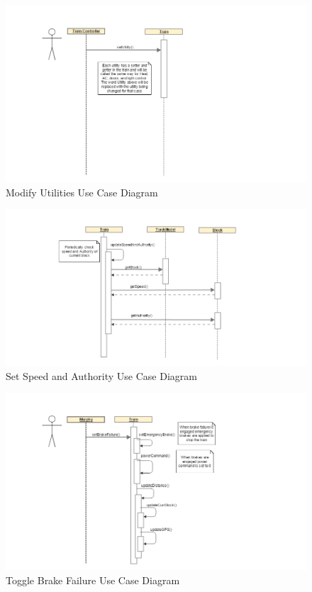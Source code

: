 \documentclass[]{article}
\begin{document}
\begin{figure}[H]
	\centering
	\includegraphics[scale=.3]{train_model_sqd_modify_utlilties.png}
	\caption{Modify Utilities Use Case Diagram}
\end{figure}

\begin{figure}[H]
	\centering
	\includegraphics[scale=.3]{train_model_sqd_set_speed_authority.png}
	\caption{Set Speed and Authority Use Case Diagram}
\end{figure}

\begin{figure}[H]
	\centering
	\includegraphics[scale=.3]{train_model_sqd_toggle_brake_failure.png}
	\caption{Toggle Brake Failure Use Case Diagram}
\end{figure}
\end{document}
